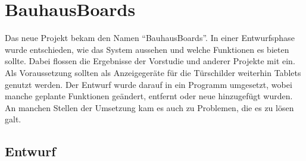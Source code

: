 \chapter{BauhausBoards}\label{BauhausBoards}
Das neue Projekt bekam den Namen ``BauhausBoards''.
In einer Entwurfsphase wurde entschieden, wie das System aussehen und welche Funktionen es bieten sollte. Dabei flossen die Ergebnisse der Vorstudie und anderer Projekte mit ein.
\\
Als Voraussetzung sollten als Anzeigegeräte für die Türschilder weiterhin Tablets genutzt werden.
Der Entwurf wurde darauf in ein Programm umgesetzt, wobei manche geplante Funktionen geändert, entfernt oder neue hinzugefügt wurden. An manchen Stellen der Umsetzung kam es auch zu Problemen, die es zu lösen galt.










\section{Entwurf}\label{Entwurf}
